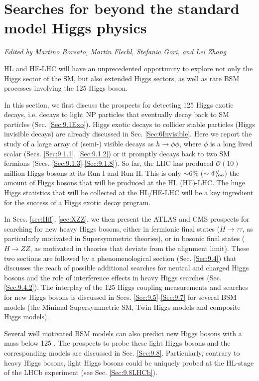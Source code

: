 \documentclass[../report.tex]{subfiles}
\begin{document}
\section{Searches for beyond the standard model Higgs physics\label{sec9}}

\begin{center}
    {\it{Edited by Martino Borsato, Martin Flechl, Stefania Gori, and Lei Zhang}}
\end{center}
HL and HE-LHC will have an unprecedented opportunity to explore not only the Higgs sector of the SM, but also extended Higgs sectors, as well as rare BSM processes involving the 125 \UGeV Higgs boson. 

In this section, we first discuss the prospects for detecting 125 \UGeV Higgs exotic decays, i.e. decays to light NP particles that eventually decay back to SM particles (Sec. \ref{Sec:9.1Exo}). Higgs exotic decays to collider stable particles (Higgs invisible decays) are already discussed in Sec. \ref{Sec:6Invisible}. Here we report the study of a large array of (semi-) visible decays as $h\to \phi\phi$, where $\phi$ is a long lived scalar (Secs. \ref{Sec:9.1.1}, \ref{Sec:9.1.2}) or it promptly decays back to two SM fermions (Secs. \ref{Sec:9.1.3}-\ref{Sec:9.1.8}). So far, the LHC has produced $\mathcal O(10)$ million Higgs bosons at its Run I and Run II. This is only $\sim 6\%$ ($\sim 4{}^\text{o}\mkern-5mu/\mkern-3mu_\text{oo}$) the amount of Higgs bosons that will be produced at the HL (HE)-LHC. The huge Higgs statistics that will be collected at the HL/HE-LHC will be a key ingredient for the success of a Higgs exotic decay program. 

In Secs. \ref{sec:Hff}, \ref{sec:XZZ}, we then present the ATLAS and CMS prospects for searching for new heavy Higgs bosons, either in fermionic final states ($H\to\tau\tau$, as particularly motivated in Supersymmetric theories), or in bosonic final states ($H\to ZZ$, as motivated in theories that deviate from the alignment limit). These two sections are followed by a phenomenological section (Sec. \ref{Sec:9.4}) that discusses the reach of possible additional searches for neutral and charged Higgs bosons and the role of interference effects in heavy Higgs searches (Sec. \ref{Sec.9.4.2}). The interplay of the 125 Higgs coupling measurements and searches for new Higgs bosons is discussed in Secs. \ref{Sec:9.5}-\ref{Sec:9.7} for several BSM models (the Minimal Supersymmetric SM, Twin Higgs models and composite Higgs models). 

Several well motivated BSM models can also predict new Higgs bosons with a mass below 125 \UGeV. The prospects to probe these light Higgs bosons and the corresponding models are discussed in Sec. \ref{Sec:9.8}. Particularly, contrary to heavy Higgs bosons, light Higgs bosons could be uniquely probed at the HL-stage of the LHCb experiment (see Sec. \ref{Sec:9.8LHCb}).
\end{document}
